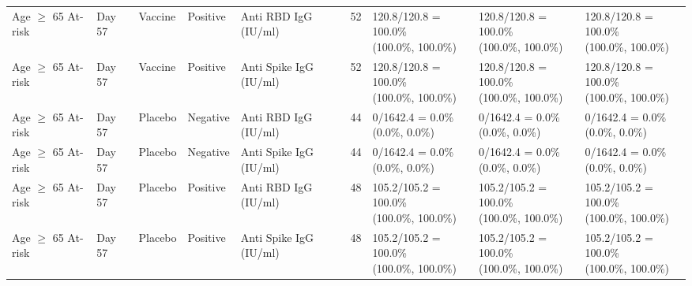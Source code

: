 \documentclass[]{book}
\theoremstyle{definition}
\theoremstyle{definition}
\theoremstyle{definition}
\newcommand{\1}{\mathbbm{1}}
\begin{document}
\begin{landscape}
\begin{ThreePartTable}
\begin{longtable}[t]{>{\raggedright\arraybackslash}p{2.7cm}llllllll}
\hspace{1em}Age $\geq$ 65 At-risk & Day 57 & Vaccine & Positive & Anti RBD IgG (IU/ml) & 52 & \makecell[l]{120.8/120.8 = 100.0\%\\(100.0\%, 100.0\%)} & \makecell[l]{120.8/120.8 = 100.0\%\\(100.0\%, 100.0\%)} & \makecell[l]{120.8/120.8 = 100.0\%\\(100.0\%, 100.0\%)}\\
\hspace{1em}Age $\geq$ 65 At-risk & Day 57 & Vaccine & Positive & Anti Spike IgG (IU/ml) & 52 & \makecell[l]{120.8/120.8 = 100.0\%\\(100.0\%, 100.0\%)} & \makecell[l]{120.8/120.8 = 100.0\%\\(100.0\%, 100.0\%)} & \makecell[l]{120.8/120.8 = 100.0\%\\(100.0\%, 100.0\%)}\\
\hspace{1em}Age $\geq$ 65 At-risk & Day 57 & Placebo & Negative & Anti RBD IgG (IU/ml) & 44 & \makecell[l]{0/1642.4 = 0.0\%\\(0.0\%, 0.0\%)} & \makecell[l]{0/1642.4 = 0.0\%\\(0.0\%, 0.0\%)} & \makecell[l]{0/1642.4 = 0.0\%\\(0.0\%, 0.0\%)}\\
\hspace{1em}Age $\geq$ 65 At-risk & Day 57 & Placebo & Negative & Anti Spike IgG (IU/ml) & 44 & \makecell[l]{0/1642.4 = 0.0\%\\(0.0\%, 0.0\%)} & \makecell[l]{0/1642.4 = 0.0\%\\(0.0\%, 0.0\%)} & \makecell[l]{0/1642.4 = 0.0\%\\(0.0\%, 0.0\%)}\\
\hspace{1em}Age $\geq$ 65 At-risk & Day 57 & Placebo & Positive & Anti RBD IgG (IU/ml) & 48 & \makecell[l]{105.2/105.2 = 100.0\%\\(100.0\%, 100.0\%)} & \makecell[l]{105.2/105.2 = 100.0\%\\(100.0\%, 100.0\%)} & \makecell[l]{105.2/105.2 = 100.0\%\\(100.0\%, 100.0\%)}\\
\hspace{1em}Age $\geq$ 65 At-risk & Day 57 & Placebo & Positive & Anti Spike IgG (IU/ml) & 48 & \makecell[l]{105.2/105.2 = 100.0\%\\(100.0\%, 100.0\%)} & \makecell[l]{105.2/105.2 = 100.0\%\\(100.0\%, 100.0\%)} & \makecell[l]{105.2/105.2 = 100.0\%\\(100.0\%, 100.0\%)}\\

\end{longtable}
\end{ThreePartTable}
\end{landscape}
\end{document}
